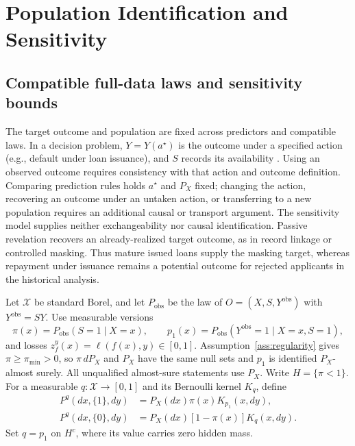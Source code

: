 \section{Population Identification and Sensitivity}
\label{app:a}

\subsection{Compatible full-data laws and sensitivity bounds}
\label{app:compatibility}\label{app:target-outcomes}

The target outcome and population are fixed across predictors and compatible laws. In a decision problem, $Y=Y(a^\star)$ is the outcome under a specified action (e.g., default under loan issuance), and $S$ records its availability \citep{lakkaraju2017selective,kleinberg2015prediction,kleinberg2018human}. Using an observed outcome requires consistency with that action and outcome definition. Comparing prediction rules holds $a^\star$ and $P_X$ fixed; changing the action, recovering an outcome under an untaken action, or transferring to a new population requires an additional causal or transport argument. The sensitivity model supplies neither exchangeability nor causal identification. Passive revelation recovers an already-realized target outcome, as in record linkage or controlled masking. Thus mature issued loans supply the masking target, whereas repayment under issuance remains a potential outcome for rejected applicants in the historical analysis.

Let $\mathcal X$ be standard Borel, and let $P_{\mathrm{obs}}$ be the law of $O=(X,S,Y^{\mathrm{obs}})$ with $Y^{\mathrm{obs}}=SY$. Use measurable versions
\[
\pi(x)=P_{\mathrm{obs}}(S=1\mid X=x),\qquad
p_1(x)=P_{\mathrm{obs}}(Y^{\mathrm{obs}}=1\mid X=x,S=1),
\]
and losses $z_f^y(x)=\ell(f(x),y)\in[0,1]$. Assumption~\ref{ass:regularity} gives $\pi\geq\pi_{\min}>0$, so $\pi\,dP_X$ and $P_X$ have the same null sets and $p_1$ is identified $P_X$-almost surely. All unqualified almost-sure statements use $P_X$. Write $H=\{\pi<1\}$. For a measurable $q:\mathcal X\to[0,1]$ and its Bernoulli kernel $K_q$, define
\begin{equation}
\begin{split}
P^q(dx,\{1\},dy)&=P_X(dx)\pi(x)K_{p_1}(x,dy),\\
P^q(dx,\{0\},dy)&=P_X(dx)[1-\pi(x)]K_q(x,dy).
\end{split}
\label{eq:a:law-construction}
\end{equation}
Set $q=p_1$ on $H^c$, where its value carries zero hidden mass.

